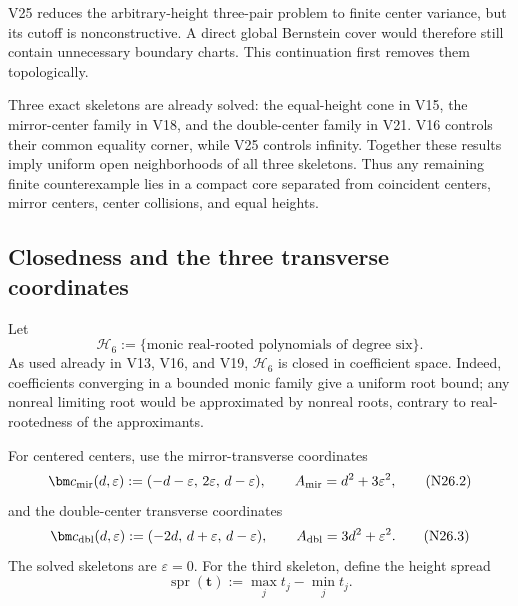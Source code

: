 \documentclass[11pt]{article}
\theoremstyle{definition}
\theoremstyle{remark}
\begin{document}
V25 reduces the arbitrary-height three-pair problem to finite center
variance, but its cutoff is nonconstructive.  A direct global Bernstein
cover would therefore still contain unnecessary boundary charts.  This
continuation first removes them topologically.

Three exact skeletons are already solved: the equal-height cone in V15,
the mirror-center family in V18, and the double-center family in V21.
V16 controls their common equality corner, while V25 controls infinity.
Together these results imply uniform open neighborhoods of all three
skeletons.  Thus any remaining finite counterexample lies in a compact
core separated from coincident centers, mirror centers, center collisions,
and equal heights.

\subsection{Closedness and the three transverse coordinates}
\label{subsec:f2v26-coordinates}

Let
\[
 \mathcal H_6:=
 \{\text{monic real-rooted polynomials of degree six}\}.
 \tag{N26.1}
\]
As used already in V13, V16, and V19, \(\mathcal H_6\) is closed in
coefficient space.  Indeed, coefficients converging in a bounded monic
family give a uniform root bound; any nonreal limiting root would be
approximated by nonreal roots, contrary to real-rootedness of the
approximants.

For centered centers, use the mirror-transverse coordinates
\[
 \bm c_{\rm mir}(d,\varepsilon)
 :=(-d-\varepsilon,\,2\varepsilon,\,d-\varepsilon),
 \qquad
 A_{\rm mir}=d^2+3\varepsilon^2,
 \tag{N26.2}
\]
and the double-center transverse coordinates
\[
 \bm c_{\rm dbl}(d,\varepsilon)
 :=(-2d,\,d+\varepsilon,\,d-\varepsilon),
 \qquad
 A_{\rm dbl}=3d^2+\varepsilon^2.
 \tag{N26.3}
\]
The solved skeletons are \(\varepsilon=0\).  For the third skeleton,
define the height spread
\[
 \operatorname{spr}(\bm t):=
 \max_jt_j-\min_jt_j.
 \tag{N26.4}
\]
\end{document}
